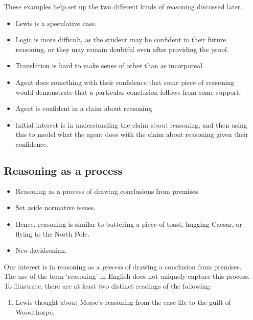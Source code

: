 \documentclass[10pt]{article}
\begin{document}
\begin{note}
  These examples help set up the two different kinds of reasoning discussed later.
  \begin{itemize}
  \item Lewis is a speculative case.
  \item Logic is more difficult, as the student may be confident in their future reasoning, or they may remain doubtful even after providing the proof.
  \item Translation is hard to make sense of other than as incorporeal.
  \end{itemize}
\end{note}

\begin{itemize}
\item Agent does something with their confidence that some piece of reasoning would demonstrate that a particular conclusion follows from some support.
\item Agent is confident in a claim about reasoning
\item Initial interest is in understanding the claim about reasoning, and then using this to model what the agent does with the claim about reasoning given their confidence.
\end{itemize}

\subsection{Reasoning as a process}
\label{sec:reasoning-as-process}

\begin{itemize}
\item Reasoning as a process of drawing conclusions from premises.
\item Set aside normative issues.
\item Hence, reasoning is similar to buttering a piece of toast, hugging Caesar, or flying to the North Pole.
\item Neo-davidsonian.
\end{itemize}

Our interest is in reasoning as a \emph{process} of drawing a conclusion from premises.
The use of the term `reasoning' in English does not uniquely capture this process.
To illustrate, there are at least two distinct readings of the following:
\begin{enumerate}
\item\label{reasoning:reading:amb} Lewis thought about Morse's reasoning from the case file to the guilt of Woodthorpe.
\end{enumerate}
\end{document}

